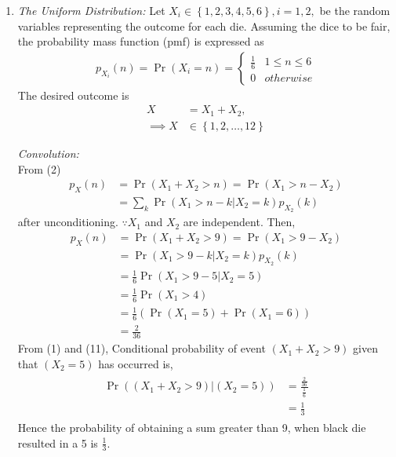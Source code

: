 \documentclass[10pt,twocolumn]{article}
\providecommand{\pr}[1]{\ensuremath{\Pr\left(#1\right)}}
\providecommand{\brak}[1]{\ensuremath{\left(#1\right)}}
\providecommand{\cbrak}[1]{\ensuremath{\left\{#1\right\}}}
\begin{document}
\begin{enumerate}
\item  {\em The Uniform Distribution: }Let $X_i \in \cbrak{1,2,3,4,5,6}, i = 1,2,$ be the random variables representing the outcome for each die.  Assuming the dice to be fair, the probability mass function (pmf) is expressed as 
\begin{align}
p_{X_i}(n) = \pr{X_i = n} = 
\begin{cases}
\frac{1}{6} & 1 \le n \le 6
\\
0 & otherwise
\end{cases}
\end{align}
The desired outcome is
\begin{align}
X &= X_1 + X_2, \\
\implies X &\in \cbrak{1,2,\dots,12}
\end{align}

{\em Convolution: } \\
From (2)
\begin{align}
p_X(n) &= \pr{X_1 + X_2 > n} = \pr{X_1  > n -X_2} \\
&= \sum_{k}^{}\pr{X_1  > n -k | X_2 = k}p_{X_2}(k)
\end{align}
after unconditioning. $\because X_1$ and $X_2$ are independent.
Then,
\begin{align}
p_X(n) &= \pr{X_1 + X_2 > 9} = \pr{X_1  > 9 -X_2} \\
&= \pr{X_1  > 9 -k | X_2 = k}p_{X_2}(k) \\
&= \frac{1}{6} \pr{X_1  > 9 -5 | X_2 = 5} \\
&= \frac{1}{6} \pr{X_1 > 4} \\
&= \frac{1}{6} (\pr{X_1 = 5} + \pr{X_1 = 6}) \\
&= \frac{2}{36}
\end{align}
From (1) and (11), Conditional probability of event $(X_1 + X_2 > 9)$ given that $(X_2 = 5)$ has occurred is,
\begin{align}
\begin{split}
\Pr{\brak{\brak{X_1 + X_2 > 9}|\brak{X_2=5}}} &= 
\frac{\frac{2}{36}}{\frac{1}{6}}\\
&=\frac{1}{3}
\end{split}
\end{align}  
Hence the probability of obtaining a sum greater than 9, when black die resulted in a 5 is $\frac{1}{3}$. 


\end{enumerate}
\end{document}
